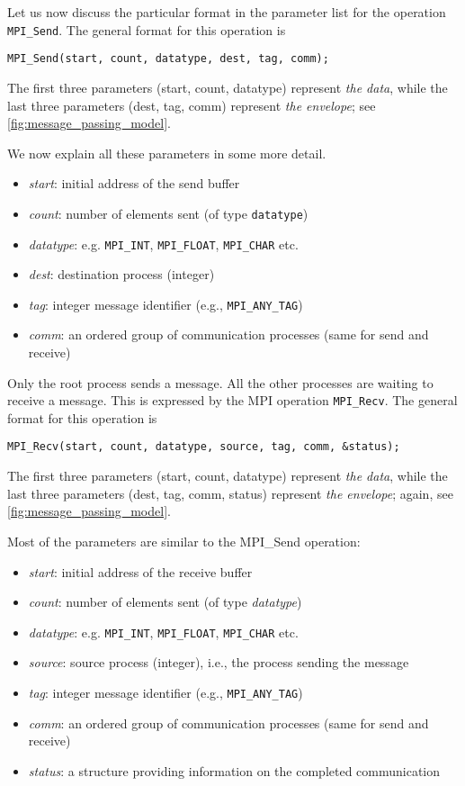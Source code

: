 Let us now discuss the particular format in the parameter list for the operation
\texttt{MPI\_Send}. The general format for this operation is
\begin{lstlisting}[style=c]
  MPI_Send(start, count, datatype, dest, tag, comm);
\end{lstlisting}
The first three parameters (start, count, datatype) represent \emph{the data},
while the last three parameters (dest, tag, comm) represent \emph{the envelope};
see \autoref{fig:message_passing_model}.

We now explain all these parameters in some more detail.
\begin{itemize}
\item \emph{start}: initial address of the send buffer
\item \emph{count}: number of elements sent (of type \texttt{datatype})
\item \emph{datatype}: e.g. \texttt{MPI\_INT}, \texttt{MPI\_FLOAT}, \texttt{MPI\_CHAR} etc.
\item \emph{dest}: destination process (integer)
\item \emph{tag}: integer message identifier (e.g., \texttt{MPI\_ANY\_TAG})
\item \emph{comm}: an ordered group of communication processes (same for send
  and receive)
\end{itemize}

Only the root process sends a message. All the other processes are waiting to
receive a message. This is expressed by the MPI operation \texttt{MPI\_Recv}.
The general format for this operation is
\begin{lstlisting}[style=c]
  MPI_Recv(start, count, datatype, source, tag, comm, &status);
\end{lstlisting}
The first three parameters (start, count, datatype) represent \emph{the data},
while the last three parameters (dest, tag, comm, status) represent \emph{the
envelope}; again, see \autoref{fig:message_passing_model}.

Most of the parameters are similar to the MPI\_Send operation:
\begin{itemize}
\item \emph{start}: initial address of the receive buffer
\item \emph{count}: number of elements sent (of type \emph{datatype})
\item \emph{datatype}: e.g. \texttt{MPI\_INT}, \texttt{MPI\_FLOAT}, \texttt{MPI\_CHAR} etc.
\item \emph{source}: source process (integer), i.e., the process sending the message
\item \emph{tag}: integer message identifier (e.g., \texttt{MPI\_ANY\_TAG})
\item \emph{comm}: an ordered group of communication processes (same for send and receive)
\item \emph{status}: a structure providing information on the completed communication
\end{itemize}

